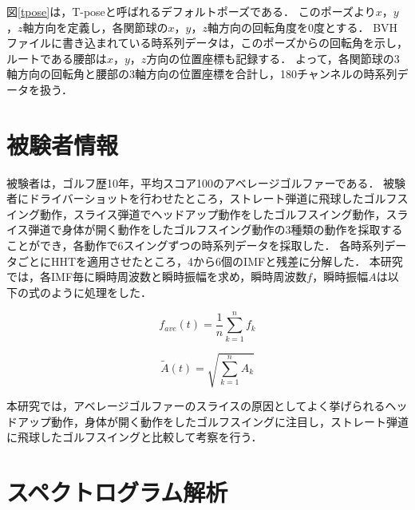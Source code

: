図\ref{tpose}は，T-poseと呼ばれるデフォルトポーズである．
このポーズより$x$，$y$，$z$軸方向を定義し，各関節球の$x$，$y$，$z$軸方向の回転角度を0度とする．
BVHファイルに書き込まれている時系列データは，このポーズからの回転角を示し，ルートである腰部は$x$，$y$，$z$方向の位置座標も記録する．
よって，各関節球の3軸方向の回転角と腰部の3軸方向の位置座標を合計し，180チャンネルの時系列データを扱う．

\section{被験者情報}
被験者は，ゴルフ歴10年，平均スコア100のアベレージゴルファーである．
被験者にドライバーショットを行わせたところ，ストレート弾道に飛球したゴルフスイング動作，スライス弾道でヘッドアップ動作をしたゴルフスイング動作，スライス弾道で身体が開く動作をしたゴルフスイング動作の3種類の動作を採取することができ，各動作で6スイングずつの時系列データを採取した．
各時系列データごとにHHTを適用させたところ，4から6個のIMFと残差に分解した．
本研究では，各IMF毎に瞬時周波数と瞬時振幅を求め，瞬時周波数$f$，瞬時振幅$A$は以下の式のように処理をした．

\begin{equation}
    f_{ave}(t) = \frac{1}{n} \sum_{k=1}^{n} f_{k}
\end{equation}

\begin{equation}
    \tilde{A}(t) = \sqrt{\sum_{k=1}^{n} A_{k}}
\end{equation}

本研究では，アベレージゴルファーのスライスの原因としてよく挙げられるヘッドアップ動作，身体が開く動作をしたゴルフスイングに注目し，ストレート弾道に飛球したゴルフスイングと比較して考察を行う．

\section{スペクトログラム解析}
